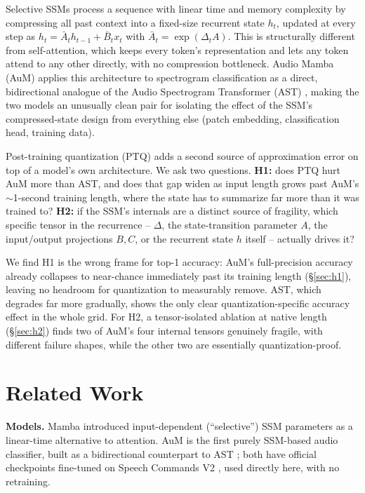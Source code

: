 \documentclass[10pt,twocolumn]{article}
\begin{document}
Selective SSMs \citep{gu2023mamba} process a sequence with linear time and memory complexity by compressing all past context into a fixed-size recurrent state $h_t$, updated at every step as $h_t = \bar{A}_t h_{t-1} + \bar{B}_t x_t$ with $\bar{A}_t = \exp(\Delta_t A)$. This is structurally different from self-attention, which keeps every token's representation and lets any token attend to any other directly, with no compression bottleneck. Audio Mamba (AuM) \citep{erol2024aum} applies this architecture to spectrogram classification as a direct, bidirectional analogue of the Audio Spectrogram Transformer (AST) \citep{gong2021ast}, making the two models an unusually clean pair for isolating the effect of the SSM's compressed-state design from everything else (patch embedding, classification head, training data).

Post-training quantization (PTQ) adds a second source of approximation error on top of a model's own architecture. We ask two questions. \textbf{H1:} does PTQ hurt AuM more than AST, and does that gap widen as input length grows past AuM's $\sim$1-second training length, where the state has to summarize far more than it was trained to? \textbf{H2:} if the SSM's internals are a distinct source of fragility, which specific tensor in the recurrence -- $\Delta$, the state-transition parameter $A$, the input/output projections $B,C$, or the recurrent state $h$ itself -- actually drives it?

We find H1 is the wrong frame for top-1 accuracy: AuM's full-precision accuracy already collapses to near-chance immediately past its training length (\S\ref{sec:h1}), leaving no headroom for quantization to measurably remove. AST, which degrades far more gradually, shows the only clear quantization-specific accuracy effect in the whole grid. For H2, a tensor-isolated ablation at native length (\S\ref{sec:h2}) finds two of AuM's four internal tensors genuinely fragile, with different failure shapes, while the other two are essentially quantization-proof.

\section{Related Work}

\textbf{Models.} Mamba \citep{gu2023mamba} introduced input-dependent (``selective'') SSM parameters as a linear-time alternative to attention. AuM \citep{erol2024aum} is the first purely SSM-based audio classifier, built as a bidirectional counterpart to AST \citep{gong2021ast}; both have official checkpoints fine-tuned on Speech Commands V2 \citep{warden2018speechcommands}, used directly here, with no retraining.
\end{document}

